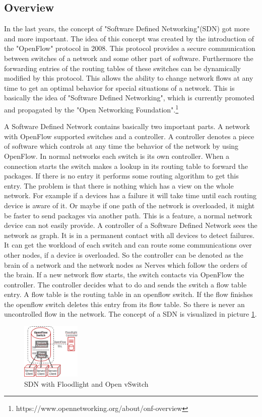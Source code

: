 \subsection{Overview}
In the last years, the concept of "Software Defined Networking"(SDN) got more and more important. The idea of this concept was created by the introduction of the "OpenFlow" protocol in 2008\cite{Mc2008}. This protocol provides a secure communication between switches of a network and some other part of software. Furthermore the forwarding entries of the routing tables of these switches can be dynamically modified by this protocol. This allows the ability to change network flows at any time to get an optimal behavior for special situations of a network. This is basically the idea of "Software Defined Networking", which is currently promoted and propagated by the "Open Networking Foundation".\footnote{https://www.opennetworking.org/about/onf-overview} 

A Software Defined Network contains basically two important parts. A network with OpenFlow supported switches and a controller. A controller denotes a piece of software which controls at any time the behavior of the network by using OpenFlow. In normal networks each switch is its own controller. When a connection starts the switch makes a lookup in its routing table to forward the packages. If there is no entry it performs some routing algorithm to get this entry. The problem is that there is nothing which has a view on the whole network. For example if a devices has a failure it will take time until each routing device is aware of it. Or maybe if one path of the network is overloaded, it might be faster to send packages via another path. This is a feature, a normal network device can not easily provide. A controller of a Software Defined Network sees the network as graph. It is in a permanent contact with all devices to detect failures. It can get the workload of each switch and can route some communications over other nodes, if a device is overloaded. So the controller can be denoted as the brain of a network and the network nodes as Nerves which follow the orders of the brain. If a new network flow starts, the switch contacts via OpenFlow the controller. The controller decides what to do and sends the switch a flow table entry. A flow table is the routing table in an openflow switch. If the flow finishes the openflow switch deletes this entry from its flow table. So there is never an uncontrolled flow in the network. The concept of a SDN is visualized in picture \ref{sdn}.\\
\begin{figure}[ht]
\centering
\includegraphics[width=0.25\textwidth]{img/sdn} 
\caption{SDN with Floodlight and Open vSwitch}
\label{sdn}
\end{figure}
 

